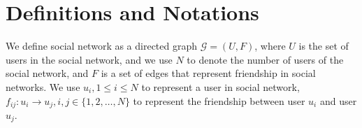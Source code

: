 \documentclass[a4paper]{article}
\begin{document}

\section{Definitions and Notations}

We define social network as a directed graph $\mathcal{G}=(U,F)$,
where $U$ is the set of users in the social network, and we use $N$ to
denote the number of users of the social network, and $F$ is a set of
edges that represent friendship in social networks. We use $u_i, 1\leq
i\leq N$ to represent a user in social network, 
$f_{ij}:u_i\rightarrow u_j, i,j\in \{1,2,\ldots,N\}$ to represent the
friendship between user $u_i$ and user $u_j$.
\end{document}
